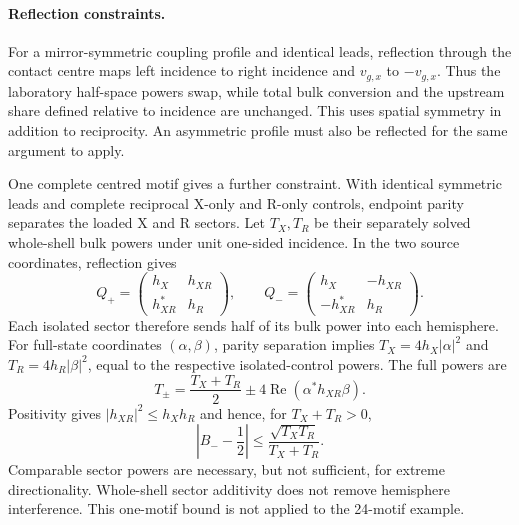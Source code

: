 \documentclass[10pt,aps,onecolumn,notitlepage,nofootinbib]{revtex4-2}
\begin{document}
\paragraph*{Reflection constraints.}
For a mirror-symmetric coupling profile and identical leads, reflection through the contact centre maps left incidence to right incidence and $v_{g,x}$ to $-v_{g,x}$. Thus the laboratory half-space powers swap, while total bulk conversion and the upstream share defined relative to incidence are unchanged. This uses spatial symmetry in addition to reciprocity. An asymmetric profile must also be reflected for the same argument to apply.

One complete centred motif gives a further constraint. With identical symmetric leads and complete reciprocal X-only and R-only controls, endpoint parity separates the loaded X and R sectors. Let $T_X,T_R$ be their separately solved whole-shell bulk powers under unit one-sided incidence. In the two source coordinates, reflection gives
\begin{equation}
 Q_+=\begin{pmatrix}h_X&h_{XR}\\h_{XR}^*&h_R\end{pmatrix},
 \qquad
 Q_-=\begin{pmatrix}h_X&-h_{XR}\\-h_{XR}^*&h_R\end{pmatrix}.
 \label{eq:sm-pred-parity-kernels}
\end{equation}
Each isolated sector therefore sends half of its bulk power into each hemisphere. For full-state coordinates $(\alpha,\beta)$, parity separation implies $T_X=4h_X|\alpha|^2$ and $T_R=4h_R|\beta|^2$, equal to the respective isolated-control powers. The full powers are
\begin{equation}
 T_\pm=\frac{T_X+T_R}{2}\pm4\operatorname{Re}(\alpha^*h_{XR}\beta).
\end{equation}
Positivity gives $|h_{XR}|^2\leq h_Xh_R$ and hence, for $T_X+T_R>0$,
\begin{equation}
 \left|B_--\frac12\right|
 \leq\frac{\sqrt{T_XT_R}}{T_X+T_R}.
 \label{eq:sm-pred-directional-bound}
\end{equation}
Comparable sector powers are necessary, but not sufficient, for extreme directionality. Whole-shell sector additivity does not remove hemisphere interference. This one-motif bound is not applied to the 24-motif example.
\end{document}
